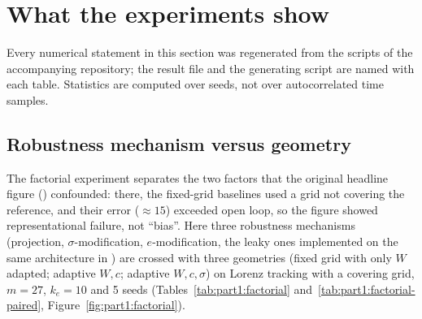 \section{What the experiments show}\label{sec:p1-experiments}

Every numerical statement in this section was regenerated from the scripts of the accompanying repository; the result
file and the generating script are named with each table. Statistics are computed over seeds, not over autocorrelated
time samples.

\subsection{Robustness mechanism versus geometry}

The factorial experiment  separates the two factors that the original headline
figure () confounded: there, the fixed-grid baselines used a grid not covering
the reference, and their error ($\approx15$) exceeded open loop, so the figure showed representational failure, not
``bias''. Here three robustness mechanisms (projection, $\sigma$-modification, $e$-modification, the leaky ones
implemented on the same architecture in ) are crossed with three geometries
(fixed grid with only $W$ adapted; adaptive $W,c$; adaptive $W,c,\sigma$) on Lorenz tracking with a covering grid,
$m=27$, $k_e=10$ and 5 seeds (Tables~\ref{tab:part1:factorial} and~\ref{tab:part1:factorial-paired},
Figure~\ref{fig:part1:factorial}).

